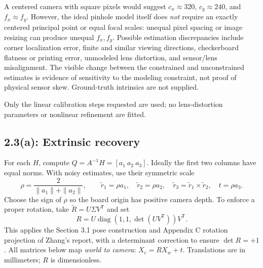 \documentclass[10pt,letterpaper]{article}
\newcommand{\T}{^{\mathsf T}}
\begin{document}
A centered camera with square pixels would suggest $c_x\approx320$,
$c_y\approx240$, and $f_x\approx f_y$. However, the ideal pinhole model
itself does \emph{not} require an exactly centered principal point or equal
focal scales: unequal pixel spacing or image resizing can produce unequal
$f_x,f_y$. Possible estimation discrepancies include corner localization
error, finite and similar viewing directions, checkerboard flatness or
printing error, unmodeled lens distortion, and sensor/lens misalignment.
The visible change between the constrained and unconstrained estimates is
evidence of sensitivity to the modeling constraint, not proof of physical
sensor skew. Ground-truth intrinsics are not supplied.

Only the linear calibration steps requested are used; no lens-distortion
parameters or nonlinear refinement are fitted.

\clearpage
\subsection*{2.3(a): Extrinsic recovery}
For each $H$, compute $Q=A^{-1}H=[a_1\ a_2\ a_3]$. Ideally the first two
columns have equal norms. With noisy estimates, use their symmetric scale
\[
\rho=\frac{2}{\|a_1\|+\|a_2\|},\qquad
\tilde r_1=\rho a_1,\quad \tilde r_2=\rho a_2,\quad
\tilde r_3=\tilde r_1\times\tilde r_2,\quad t=\rho a_3.
\]
Choose the sign of $\rho$ so the board origin has positive camera depth.
To enforce a proper rotation, take
$\tilde R=U\Sigma V\T$ and set
\[
R=U\operatorname{diag}(1,1,\det(UV\T))V\T.
\]
This applies the Section 3.1 pose construction and Appendix C rotation
projection of Zhang's report, with a determinant correction to ensure $\det R=+1$.
All matrices below map \emph{world to camera}:
$X_c=RX_w+t$. Translations are in millimeters; $R$ is dimensionless.
\begingroup
\small
\setlength{\jot}{6pt}


\endgroup

\clearpage
\end{document}
